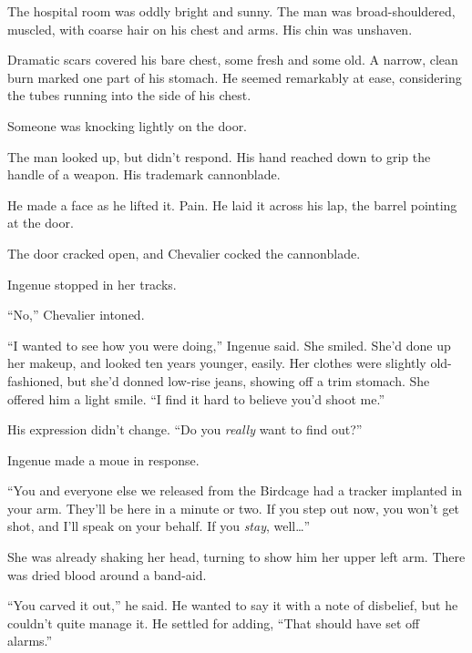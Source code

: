 The hospital room was oddly bright and sunny.  The man was broad-shouldered, muscled, with coarse hair on his chest and arms.  His chin was unshaven.



Dramatic scars covered his bare chest, some fresh and some old.  A narrow, clean burn marked one part of his stomach.  He seemed remarkably at ease, considering the tubes running into the side of his chest.



Someone was knocking lightly on the door.



The man looked up, but didn't respond.  His hand reached down to grip the handle of a weapon.  His trademark cannonblade.



He made a face as he lifted it.  Pain.  He laid it across his lap, the barrel pointing at the door.



The door cracked open, and Chevalier cocked the cannonblade.



Ingenue stopped in her tracks.



``No,'' Chevalier intoned.



``I wanted to see how you were doing,'' Ingenue said.  She smiled.  She'd done up her makeup, and looked ten years younger, easily.  Her clothes were slightly old-fashioned, but she'd donned low-rise jeans, showing off a trim stomach.  She offered him a light smile.  ``I find it hard to believe you'd shoot me.''



His expression didn't change.  ``Do you \emph{really} want to find out?''



Ingenue made a moue in response.



``You and everyone else we released from the Birdcage had a tracker implanted in your arm.  They'll be here in a minute or two.  If you step out now, you won't get shot, and I'll speak on your behalf.  If you \emph{stay}, well\ldots''



She was already shaking her head, turning to show him her upper left arm.  There was dried blood around a band-aid.



``You carved it out,'' he said.  He wanted to say it with a note of disbelief, but he couldn't quite manage it.  He settled for adding, ``That should have set off alarms.''



